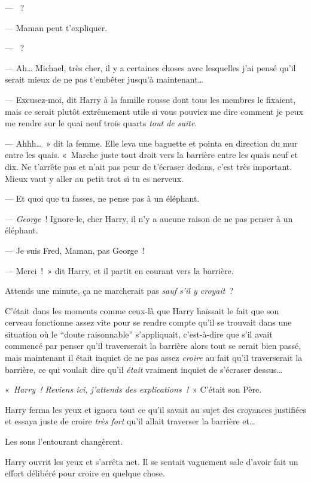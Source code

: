 --- ~?

--- Maman peut t'expliquer.

--- ~?

--- Ah… Michael, très cher, il y a certaines choses avec lesquelles j'ai pensé qu'il serait mieux de ne pas t'embêter jusqu'à maintenant…

--- Excusez-moi, dit Harry à la famille rousse dont tous les membres le fixaient, mais ce serait plutôt extrêmement utile si vous pouviez me dire comment je peux me rendre sur le quai neuf trois quarts \emph{tout de suite}.

--- Ahhh…~» dit la femme. Elle leva une baguette et pointa en direction du mur entre les quais. «~Marche juste tout droit vers la barrière entre les quais neuf et dix. Ne t'arrête pas et n'ait pas peur de t'écraser dedans, c'est très important. Mieux vaut y aller au petit trot si tu es nerveux.

--- Et quoi que tu fasses, ne pense pas à un éléphant.

--- \emph{George}~! Ignore-le, cher Harry, il n'y a aucune raison de ne pas penser à un éléphant.

--- Je suis Fred, Maman, pas George~!

--- Merci~!~» dit Harry, et il partit en courant vers la barrière.

Attends une minute, ça ne marcherait pas \emph{sauf s'il y croyait}~?

C'était dans les moments comme ceux-là que Harry haïssait le fait que son cerveau fonctionne assez vite pour se rendre compte qu'il se trouvait dans une situation où le “doute raisonnable” s'appliquait, c'est-à-dire que s'il avait commencé par penser qu'il traverserait la barrière alors tout se serait bien passé, mais maintenant il était inquiet de ne pas assez \emph{croire} au fait qu'il traverserait la barrière, ce qui voulait dire qu'il \emph{était} vraiment inquiet de s'écraser dessus…

«~\emph{Harry~! Reviens ici, j'attends des explications~!}~» C'était son Père.

Harry ferma les yeux et ignora tout ce qu'il savait au sujet des croyances justifiées et essaya juste de croire \emph{très fort} qu'il allait traverser la barrière et…

Les sons l'entourant changèrent.

Harry ouvrit les yeux et s'arrêta net. Il se sentait vaguement sale d'avoir fait un effort délibéré pour croire en quelque chose.

